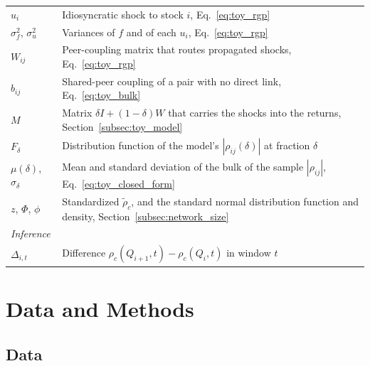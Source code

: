 \documentclass[a4paper,fleqn]{cas-sc}
\begin{document}
\begin{table}[pos=htbp]
\begin{threeparttable}
\begin{tabular}{ll}
$u_i$              & Idiosyncratic shock to stock $i$, Eq.~\eqref{eq:toy_rgp} \\
$\sigma_f^2$, $\sigma_u^2$ & Variances of $f$ and of each $u_i$, Eq.~\eqref{eq:toy_rgp} \\
$W_{ij}$           & Peer-coupling matrix that routes propagated shocks, Eq.~\eqref{eq:toy_rgp} \\
$b_{ij}$           & Shared-peer coupling of a pair with no direct link, Eq.~\eqref{eq:toy_bulk} \\
$M$                & Matrix $\delta I + (1-\delta)W$ that carries the shocks into the returns, Section~\ref{subsec:toy_model} \\
$F_\delta$         & Distribution function of the model's $|\rho_{ij}(\delta)|$ at fraction $\delta$ \\
$\mu(\delta)$, $\sigma_\delta$ & Mean and standard deviation of the bulk of the sample $|\rho_{ij}|$, Eq.~\eqref{eq:toy_closed_form} \\
$z$, $\Phi$, $\phi$ & Standardized $\tilde\rho_c$, and the standard normal distribution function and density, Section~\ref{subsec:network_size} \\
\midrule
\textit{Inference} & \\
$\Delta_{i,t}$     & Difference $\rho_c(Q_{i+1}, t) - \rho_c(Q_i, t)$ in window $t$ \\
\bottomrule
\end{tabular}
\end{threeparttable}
\end{table}

\section{Data and Methods}\label{sec:data}

\subsection{Data}\label{subsec:data_description}
\end{document}
